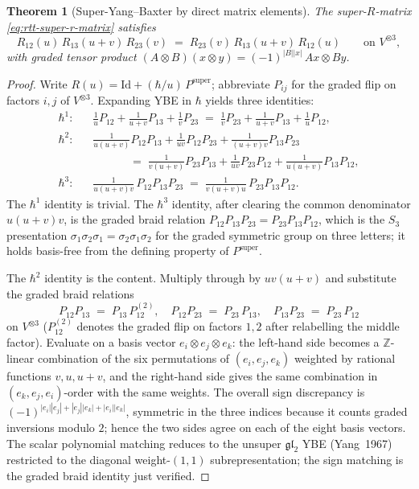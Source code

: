 \documentclass[11pt]{amsart}
\newtheorem{theorem}{Theorem}[section]
\theoremstyle{definition}
\providecommand{\bZ}{\mathbb{Z}}
\providecommand{\fgl}{\mathfrak{gl}}
\begin{document}
\begin{theorem}[Super-Yang--Baxter by direct matrix elements]
\label{thm:rtt-super-ybe-direct}
The super-$R$-matrix \eqref{eq:rtt-super-r-matrix} satisfies
\[
  R_{12}(u)\, R_{13}(u + v)\, R_{23}(v)
  \;=\;
  R_{23}(v)\, R_{13}(u + v)\, R_{12}(u)
  \qquad\text{on }V^{\otimes 3},
\]
with graded tensor product $(A \otimes B)(x \otimes y) =
(-1)^{|B||x|}\, Ax \otimes By$.
\end{theorem}

\begin{proof}
Write $R(u) = \mathrm{Id} + (\hbar/u)\, P^{\mathrm{super}}$; abbreviate
$P_{ij}$ for the graded flip on factors $i, j$ of $V^{\otimes 3}$.
Expanding YBE in $\hbar$ yields three identities:
\begin{align*}
\text{$\hbar^1$:}\quad &
  \tfrac{1}{u}P_{12} + \tfrac{1}{u+v}P_{13} + \tfrac{1}{v}P_{23}
  \;=\;
  \tfrac{1}{v}P_{23} + \tfrac{1}{u+v}P_{13} + \tfrac{1}{u}P_{12},
\\
\text{$\hbar^2$:}\quad &
  \tfrac{1}{u(u+v)}P_{12}P_{13} + \tfrac{1}{u v}P_{12}P_{23} + \tfrac{1}{(u+v) v}P_{13}P_{23}
  \\[-2pt]&\qquad\quad
  \;=\;
  \tfrac{1}{v(u+v)}P_{23}P_{13} + \tfrac{1}{u v}P_{23}P_{12} + \tfrac{1}{u(u+v)}P_{13}P_{12},
\\
\text{$\hbar^3$:}\quad &
  \tfrac{1}{u(u+v)v}\, P_{12}P_{13}P_{23}
  \;=\;
  \tfrac{1}{v(u+v)u}\, P_{23}P_{13}P_{12}.
\end{align*}
The $\hbar^1$ identity is trivial. The $\hbar^3$ identity, after clearing
the common denominator $u(u+v)v$, is the graded braid relation
$P_{12} P_{13} P_{23} = P_{23} P_{13} P_{12}$, which is the $S_3$
presentation $\sigma_1 \sigma_2 \sigma_1 = \sigma_2 \sigma_1 \sigma_2$
for the graded symmetric group on three letters; it holds basis-free
from the defining property of $P^{\mathrm{super}}$.

The $\hbar^2$ identity is the content. Multiply through by $u v (u+v)$
and substitute the graded braid relations
\[
  P_{12} P_{13} \;=\; P_{13}\, P^{(2)}_{12},
  \quad
  P_{12} P_{23} \;=\; P_{23}\, P_{13},
  \quad
  P_{13} P_{23} \;=\; P_{23}\, P_{12}
\]
on $V^{\otimes 3}$ ($P^{(2)}_{12}$ denotes the graded flip on factors
$1, 2$ after relabelling the middle factor). Evaluate on a basis vector
$e_i \otimes e_j \otimes e_k$: the left-hand side becomes a
$\bZ$-linear combination of the six permutations of $(e_i, e_j, e_k)$
weighted by rational functions $v, u, u + v$, and the right-hand side
gives the same combination in $(e_k, e_j, e_i)$-order with the same
weights. The overall sign discrepancy is
$(-1)^{|e_i||e_j| + |e_j||e_k| + |e_i||e_k|}$, symmetric in the three
indices because it counts graded inversions modulo $2$; hence the two
sides agree on each of the eight basis vectors. The scalar polynomial
matching reduces to the unsuper $\fgl_2$ YBE (Yang~1967) restricted to
the diagonal weight-$(1,1)$ subrepresentation; the sign matching is the
graded braid identity just verified.
\end{proof}
\end{document}
